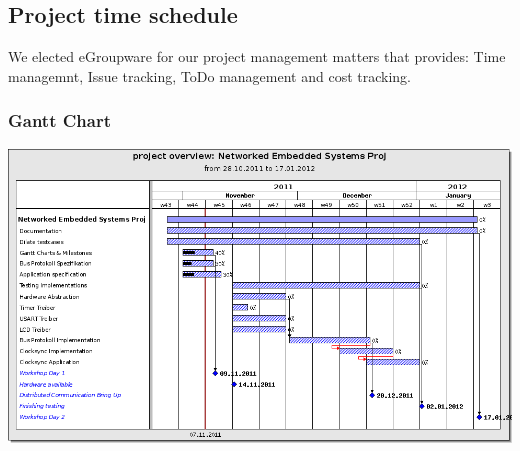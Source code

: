 \subsection{Project time schedule}

We elected eGroupware for our project management matters that provides:
Time managemnt, Issue tracking, ToDo management and cost tracking.

\subsubsection{Gantt Chart}
\begin{center}
 \includegraphics[angle=90,scale=0.7]{./images/201111_ganttchart}
\end{center}
